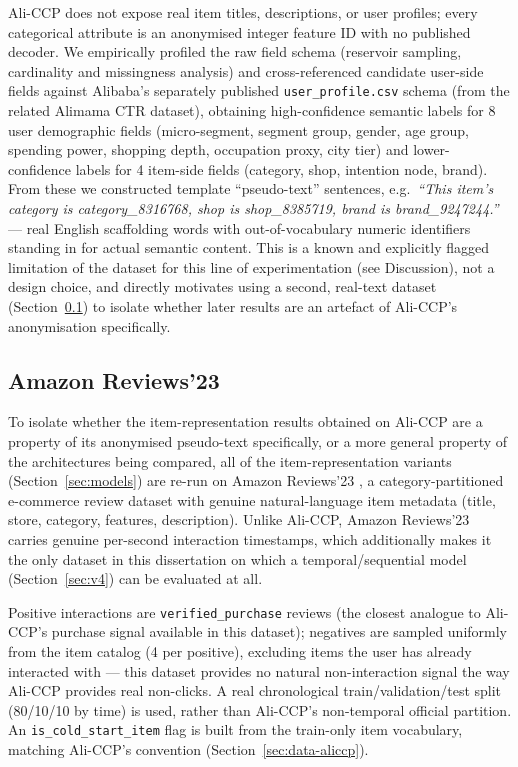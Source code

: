 Ali-CCP does not expose real item titles, descriptions, or user profiles; every categorical attribute is an anonymised integer feature ID with no published decoder. We empirically profiled the raw field schema (reservoir sampling, cardinality and missingness analysis) and cross-referenced candidate user-side fields against Alibaba's separately published \texttt{user\_profile.csv} schema (from the related Alimama CTR dataset), obtaining high-confidence semantic labels for 8 user demographic fields (micro-segment, segment group, gender, age group, spending power, shopping depth, occupation proxy, city tier) and lower-confidence labels for 4 item-side fields (category, shop, intention node, brand). From these we constructed template ``pseudo-text'' sentences, e.g.\ \textit{``This item's category is category\_8316768, shop is shop\_8385719, brand is brand\_9247244.''} --- real English scaffolding words with out-of-vocabulary numeric identifiers standing in for actual semantic content. This is a known and explicitly flagged limitation of the dataset for this line of experimentation (see Discussion), not a design choice, and directly motivates using a second, real-text dataset (Section~\ref{sec:data-amazon}) to isolate whether later results are an artefact of Ali-CCP's anonymisation specifically.

\subsection{Amazon Reviews'23}
\label{sec:data-amazon}

To isolate whether the item-representation results obtained on Ali-CCP are a property of its anonymised pseudo-text specifically, or a more general property of the architectures being compared, all of the item-representation variants (Section~\ref{sec:models}) are re-run on Amazon Reviews'23 \cite{hou2024bridging}, a category-partitioned e-commerce review dataset with genuine natural-language item metadata (title, store, category, features, description). Unlike Ali-CCP, Amazon Reviews'23 carries genuine per-second interaction timestamps, which additionally makes it the only dataset in this dissertation on which a temporal/sequential model (Section~\ref{sec:v4}) can be evaluated at all.

Positive interactions are \texttt{verified\_purchase} reviews (the closest analogue to Ali-CCP's purchase signal available in this dataset); negatives are sampled uniformly from the item catalog (4 per positive), excluding items the user has already interacted with --- this dataset provides no natural non-interaction signal the way Ali-CCP provides real non-clicks. A real chronological train/validation/test split (80/10/10 by time) is used, rather than Ali-CCP's non-temporal official partition. An \texttt{is\_cold\_start\_item} flag is built from the train-only item vocabulary, matching Ali-CCP's convention (Section~\ref{sec:data-aliccp}).

